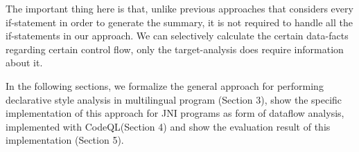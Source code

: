 The important thing here is that, unlike previous approaches that considers
every if-statement in order to generate the summary, it is not required to
handle all the if-statements in our approach. We can selectively calculate the
certain data-facts regarding certain control flow, only the target-analysis
does require information about it.

In the following sections, we formalize the general approach for performing
declarative style analysis in multilingual program (Section 3), show the
specific implementation of this approach for JNI programs as form of dataflow
analysis, implemented with CodeQL(Section 4) and show the evaluation result of
this implementation (Section 5).
